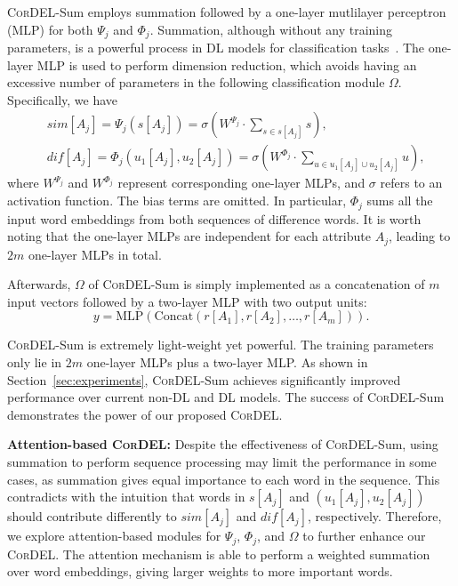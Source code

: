 \documentclass[conference]{IEEEtran}
\begin{document}
\textsc{CorDEL}-Sum employs summation followed by a one-layer mutlilayer perceptron (MLP) for both $\Psi_j$ and $\Phi_j$. Summation, although without any training parameters, is a powerful process in DL models for classification tasks~\cite{joulin2017bag,xu2019powerful}. The one-layer MLP is used to perform dimension reduction, which avoids having an excessive number of parameters in the following classification module $\Omega$. Specifically, we have
\begin{align}
    &sim[A_j] = \Psi_j(s[A_j]) = \sigma(W^{\Psi_j}\cdot \sum_{s \in s[A_j]} s), \nonumber \\
    &dif[A_j] = \Phi_j(u_1[A_j], u_2[A_j]) = \sigma(W^{\Phi_j}\cdot \sum_{u \in u_1[A_j] \cup u_2[A_j]} u), \nonumber
\end{align}
where $W^{\Psi_j}$ and $W^{\Phi_j}$ represent corresponding one-layer MLPs, and $\sigma$ refers to an activation function. The bias terms are omitted. In particular, $\Phi_j$ sums all the input word embeddings from both sequences of difference words. It is worth noting that the one-layer MLPs are independent for each attribute $A_j$, leading to $2m$ one-layer MLPs in total. 

Afterwards, $\Omega$ of \textsc{CorDEL}-Sum is simply implemented as a concatenation of $m$ input vectors followed by a two-layer MLP with two output units:
\begin{equation}\label{eqn:sum-classify}
    y = \text{MLP}(\text{Concat}(r[A_1],r[A_2],\ldots,r[A_m])).
\end{equation}

\textsc{CorDEL}-Sum is extremely light-weight yet powerful. The training parameters only lie in $2m$ one-layer MLPs plus a two-layer MLP. As shown in Section~\ref{sec:experiments}, \textsc{CorDEL}-Sum achieves significantly improved performance over current non-DL and DL models. The success of \textsc{CorDEL}-Sum demonstrates the power of our proposed \textsc{CorDEL}.

\textbf{Attention-based \textsc{CorDEL}:} Despite the effectiveness of \textsc{CorDEL}-Sum, using summation to perform sequence processing may limit the performance in some cases, as summation gives equal importance to each word in the sequence. This contradicts with the intuition that words in $s[A_j]$ and $(u_1[A_j], u_2[A_j])$ should contribute differently to $sim[A_j]$ and $dif[A_j]$, respectively. Therefore, we explore attention-based modules for $\Psi_j$, $\Phi_j$, and $\Omega$ to further enhance our \textsc{CorDEL}. The attention mechanism is able to perform a weighted summation over word embeddings, giving larger weights to more important words. 
\end{document}
